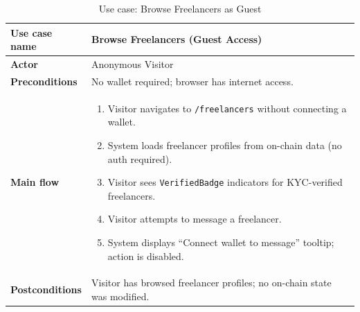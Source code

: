 \begin{table}[H]
\centering
\caption{Use case: Browse Freelancers as Guest}
\begin{tabular}{|l|p{10cm}|}
\hline
\textbf{Use case name} & Browse Freelancers (Guest Access) \\ \hline
\textbf{Actor} & Anonymous Visitor \\ \hline
\textbf{Preconditions} & No wallet required; browser has internet access. \\ \hline
\textbf{Main flow} & \begin{enumerate}[noitemsep]
    \item Visitor navigates to \texttt{/freelancers} without connecting a wallet.
    \item System loads freelancer profiles from on-chain data (no auth required).
    \item Visitor sees \texttt{VerifiedBadge} indicators for KYC-verified freelancers.
    \item Visitor attempts to message a freelancer.
    \item System displays ``Connect wallet to message'' tooltip; action is disabled.
\end{enumerate} \\ \hline
\textbf{Postconditions} & Visitor has browsed freelancer profiles; no on-chain state was modified. \\ \hline
\end{tabular}
\end{table}
